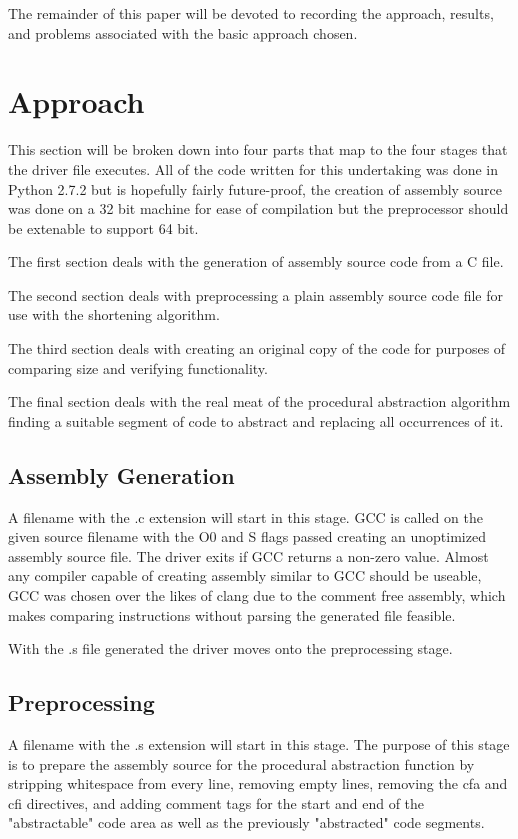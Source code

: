\documentclass[9pt,nocopyrightspace]{sigplanconf}
\begin{document}
The remainder of this paper will be devoted to recording the approach, results, and problems associated with the basic approach chosen.

\section{Approach}

This section will be broken down into four parts that map to the four stages that the driver file executes.
All of the code written for this undertaking was done in Python 2.7.2 but is hopefully fairly future-proof, the creation of assembly source was done on a 32 bit machine for ease of compilation but the preprocessor should be extenable to support 64 bit.

The first section deals with the generation of assembly source code from a C file.

The second section deals with preprocessing a plain assembly source code file for use with the shortening algorithm.

The third section deals with creating an original copy of the code for purposes of comparing size and verifying functionality.

The final section deals with the real meat of the procedural abstraction algorithm finding a suitable segment of code to abstract  and replacing all occurrences of it.

\subsection{Assembly Generation}

A filename with the .c extension will start in this stage.
GCC is called on the given source filename with the O0 and S flags passed creating an unoptimized assembly source file.
The driver exits if GCC returns a non-zero value.
Almost any compiler capable of creating assembly similar to GCC should be useable, GCC was chosen over the likes of clang due to the comment free assembly, which makes comparing instructions without parsing the generated file feasible.

With the .s file generated the driver moves onto the preprocessing stage.

\subsection{Preprocessing}

A filename with the .s extension will start in this stage.
The purpose of this stage is to prepare the assembly source for the procedural abstraction function by stripping whitespace from every line, removing empty lines, removing the cfa and cfi directives, and adding comment tags for the start and end of the "abstractable" code area as well as the previously "abstracted" code segments.
\end{document}
